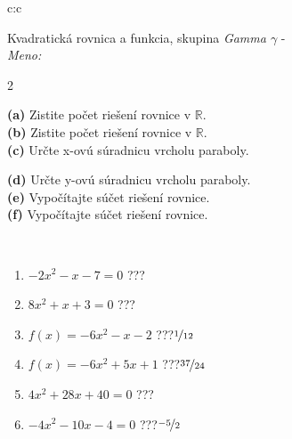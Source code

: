\documentclass[10pt]{report}
\begin{document}
\begin{tabular}{c:c}
\begin{minipage}[c][104.5mm][t]{0.5\linewidth}
\begin{center}
\vspace{7mm}
{\huge {\LARGE Kvadratická rovnica a funkcia}, skupina \textit{Gamma $\gamma$} -}\\[5mm]
\textit{Meno:}\phantom{xxxxxxxxxxxxxxxxxxxxxxxxxxxxxxxxxxxxxxxxxxxxxxxxxxxxxxxxxxxxxxxxx}\\[5mm]
\begin{minipage}{0.95\linewidth}
\begin{center}
{\small \begin{multicols}{2} \raggedright
\textbf{(a)} Zistite počet riešení rovnice v \(\mathbb{R}\). \\[1mm]
\textbf{(b)} Zistite počet riešení rovnice v \(\mathbb{R}\). \\[1mm]
\textbf{(c)} Určte x-ovú súradnicu vrcholu paraboly. \par \columnbreak
\textbf{(d)} Určte y-ovú súradnicu vrcholu paraboly. \\[1mm]
\textbf{(e)} Vypočítajte súčet riešení rovnice. \\[1mm]
\textbf{(f)} Vypočítajte súčet riešení rovnice.
\end{multicols}
}
\end{center}
\end{minipage}
\\[4mm]
\begin{minipage}{0.79\linewidth}
\begin{center}
\begin{varwidth}{\linewidth}
\begin{enumerate}
\Large
\item $-2x^2-x-7=0$\quad \dotfill\; ???\;\dotfill {}
\item $8x^2+x+3=0$\quad \dotfill\; ???\;\dotfill {}
\item $f(x)=-6x^2-x-2$\quad \dotfill\; ???\;\dotfill \quad $\nicefrac{1}{12}$
\item $f(x)=-6x^2+5x+1$\quad \dotfill\; ???\;\dotfill \quad $\nicefrac{37}{24}$
\item $4x^2+28x+40=0$\quad \dotfill\; ???\;\dotfill {}
\item $-4x^2-10x-4=0$\quad \dotfill\; ???\;\dotfill \quad $\nicefrac{-5}{2}$
\end{enumerate}
\end{varwidth}
\end{center}

\end{minipage}
\end{center}
\end{minipage}
\end{tabular}
\end{document}
